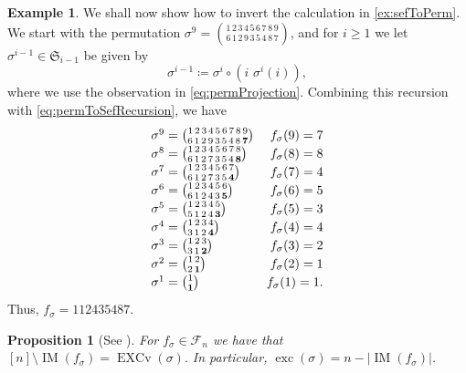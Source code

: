 \documentclass[reqno]{amsart}
\newtheorem{proposition}[theorem]{Proposition}
\theoremstyle{definition}
\newtheorem{example}[theorem]{Example}
\newcommand{\symS}{\mathfrak{S}}
\newcommand{\SEF}{\mathcal{F}}  %
\DeclareMathOperator{\exc}{exc}
\DeclareMathOperator{\EXCv}{EXCv}
\DeclareMathOperator{\supp}{IM}
\begin{document}
\begin{example}\label{ex:permToSef}
We shall now show how to invert the calculation in \cref{ex:sefToPerm}.
We start with the permutation $\sigma^9=\binom{1\,2\,3\,4\,5\,6\,7\,8\,9}{6\,1\,2\,9\,3\,5\,4\,8\,7}$,
and for $i \geq 1$ we let $\sigma^{i-1} \in \symS_{i-1}$ be given by
\[
  \sigma^{i-1} \coloneqq \sigma^{i} \circ (i\,\,\sigma^i(i)),
\]
where we use the observation in \eqref{eq:permProjection}.
Combining this recursion with \eqref{eq:permToSefRecursion},
we have
\begin{equation*}
\begingroup
\renewcommand*{\arraystretch}{1.2}
\begin{array}{lr}
	\sigma^9=\binom{1\,2\,3\,4\,5\,6\,7\,8\,9}{6\,1\,2\,9\,3\,5\,4\,8\,\mathbf 7}  & f_{\sigma}(9)=7 \\
	\sigma^8=\binom{1\,2\,3\,4\,5\,6\,7\,8}{6\,1\,2\,7\,3\,5\,4\,\mathbf 8 } & f_{\sigma}(8)=8 \\
	\sigma^7=\binom{1\,2\,3\,4\,5\,6\,7}{6\,1\,2\,7\,3\,5\, \mathbf 4} & f_{\sigma}(7)=4 \\
	\sigma^6=\binom{1\,2\,3\,4\,5\,6}{6\,1\,2\,4\,3\,\mathbf  5} & f_{\sigma}(6)=5 \\
	\sigma^5=\binom{1\,2\,3\,4\,5}{5\,1\,2\,4\,\mathbf  3} & f_{\sigma}(5)=3 \\
	\sigma^4=\binom{1\,2\,3\,4}{3\,1\,2\,\mathbf  4} & f_{\sigma}(4)=4 \\
	\sigma^3=\binom{1\,2\,3}{3\,1\,\mathbf  2} & f_{\sigma}(3)=2 \\
	\sigma^2=\binom{1\,2}{2\,\mathbf  1} & f_{\sigma}(2)=1 \\
	\sigma^1=\binom{1}{\mathbf 1} & f_{\sigma}(1)=1.
\end{array}
\endgroup
\end{equation*}
Thus, $f_{\sigma}=112435487$.
\end{example}



\begin{proposition}[{See \cite[Prop. 3.5]{MantaciRakotondrajao2001}}]\label{prop:excAsIm}
For $f_{\sigma} \in \SEF_n$ we have that
$
 [n] \setminus \supp(f_{\sigma}) = \EXCv(\sigma).
$
In particular, $\exc(\sigma) = n - |\supp(f_{\sigma})|$.
\end{proposition}
\end{document}
